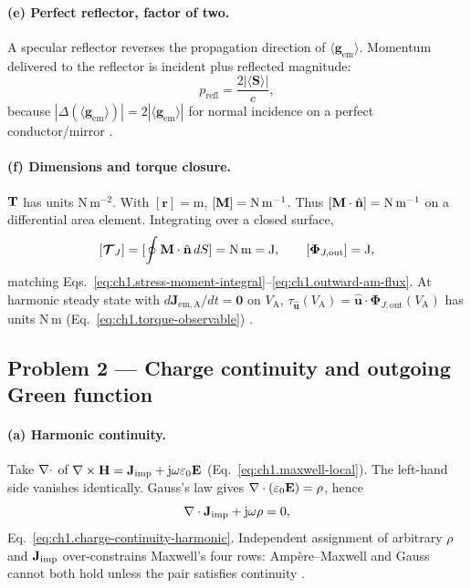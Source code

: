\paragraph{(e) Perfect reflector, factor of two.}
A specular reflector reverses the propagation direction of $\langle\mathbf{g}_{\mathrm{em}}\rangle$. Momentum delivered to the reflector is incident plus reflected magnitude:
\[
p_{\mathrm{refl}}=\frac{2|\langle\mathbf{S}\rangle|}{c},
\]
because $|\Delta(\langle\mathbf{g}_{\mathrm{em}}\rangle)|=2|\langle\mathbf{g}_{\mathrm{em}}\rangle|$ for normal incidence on a perfect conductor/mirror \cite{stratton1941,maxwell1873}.

\paragraph{(f) Dimensions and torque closure.}
$\mathbf{T}$ has units N\,m$^{-2}$. With $[\mathbf{r}]=\mathrm{m}$, $[\mathbf{M}]=\mathrm{N\,m^{-1}}$. Thus $[\mathbf{M}\cdot\hat{\mathbf{n}}]=\mathrm{N\,m^{-1}}$ on a differential area element. Integrating over a closed surface,
\[
[\boldsymbol{\mathcal{T}}_J]=[\oint\mathbf{M}\cdot\hat{\mathbf{n}}\,dS]=\mathrm{N\,m}=\mathrm{J},
\qquad
[\boldsymbol{\Phi}_{J,\mathrm{out}}]=\mathrm{J},
\]
matching Eqs.~\eqref{eq:ch1.stress-moment-integral}--\eqref{eq:ch1.outward-am-flux}. At harmonic steady state with $d\mathbf{J}_{\mathrm{em,A}}/dt=\mathbf{0}$ on $V_{\mathrm{A}}$, $\tau_{\hat{\mathbf{u}}}(V_{\mathrm{A}})=\hat{\mathbf{u}}\cdot\boldsymbol{\Phi}_{J,\mathrm{out}}(V_{\mathrm{A}})$ has units N\,m (Eq.~\eqref{eq:ch1.torque-observable}) \cite{beth1936,stratton1941}.

\subsection*{Problem 2 --- Charge continuity and outgoing Green function}

\paragraph{(a) Harmonic continuity.}
Take $\nabla\cdot$ of $\nabla\times\mathbf{H}=\mathbf{J}_{\mathrm{imp}}+\mathrm{j}\omega\varepsilon_0\mathbf{E}$ (Eq.~\eqref{eq:ch1.maxwell-local}). The left-hand side vanishes identically. Gauss's law gives $\nabla\cdot(\varepsilon_0\mathbf{E})=\rho$, hence
\[
\nabla\cdot\mathbf{J}_{\mathrm{imp}}+\mathrm{j}\omega\rho=0,
\]
Eq.~\eqref{eq:ch1.charge-continuity-harmonic}. Independent assignment of arbitrary $\rho$ and $\mathbf{J}_{\mathrm{imp}}$ over-constrains Maxwell's four rows: Amp\`ere--Maxwell and Gauss cannot both hold unless the pair satisfies continuity \cite{maxwell1873,stratton1941}.

